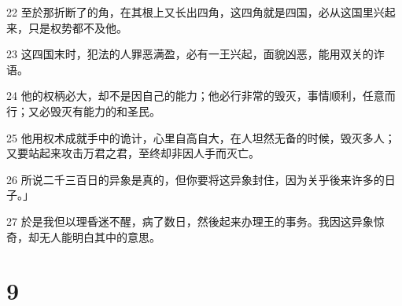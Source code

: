 \par 22 至於那折断了的角，在其根上又长出四角，这四角就是四国，必从这国里兴起来，只是权势都不及他。
\par 23 这四国末时，犯法的人罪恶满盈，必有一王兴起，面貌凶恶，能用双关的诈语。
\par 24 他的权柄必大，却不是因自己的能力；他必行非常的毁灭，事情顺利，任意而行；又必毁灭有能力的和圣民。
\par 25 他用权术成就手中的诡计，心里自高自大，在人坦然无备的时候，毁灭多人；又要站起来攻击万君之君，至终却非因人手而灭亡。
\par 26 所说二千三百日的异象是真的，但你要将这异象封住，因为关乎後来许多的日子。」
\par 27 於是我但以理昏迷不醒，病了数日，然後起来办理王的事务。我因这异象惊奇，却无人能明白其中的意思。

\chapter{9}


